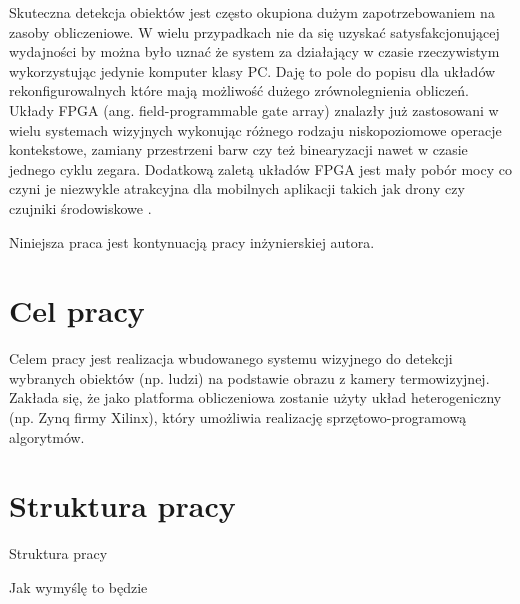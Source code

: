 Skuteczna detekcja obiektów jest często okupiona dużym zapotrzebowaniem na zasoby obliczeniowe. W wielu przypadkach nie da się uzyskać satysfakcjonującej wydajności by można było uznać że system za działający w czasie rzeczywistym wykorzystując jedynie komputer klasy PC. Daję to pole do popisu dla układów rekonfigurowalnych które mają możliwość dużego zrównolegnienia obliczeń. Układy FPGA (ang. field-programmable gate array) znalazły już zastosowani w wielu systemach wizyjnych wykonując różnego rodzaju niskopoziomowe operacje kontekstowe, zamiany przestrzeni barw czy też binearyzacji nawet w czasie jednego cyklu zegara. Dodatkową zaletą układów FPGA jest mały pobór mocy co czyni je niezwykle atrakcyjna dla mobilnych aplikacji takich jak drony czy czujniki środowiskowe \cite{garcia2014survey}. 

Niniejsza praca jest kontynuacją pracy inżynierskiej autora.

\section{Cel pracy}


Celem pracy jest realizacja wbudowanego systemu wizyjnego do detekcji wybranych obiektów (np. ludzi) na podstawie obrazu z kamery termowizyjnej. Zakłada się, że jako platforma obliczeniowa zostanie użyty układ heterogeniczny (np. Zynq firmy Xilinx), który umożliwia realizację sprzętowo-programową algorytmów.

\section{Struktura pracy}

Struktura pracy

Jak wymyślę to będzie
